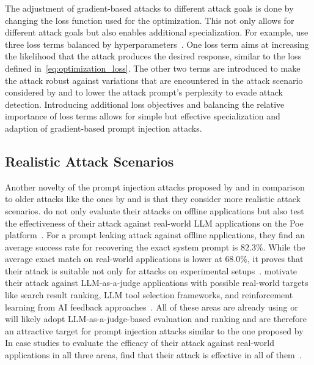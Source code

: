 The adjustment of gradient-based attacks to different attack goals is done by changing the loss function used for the optimization.
This not only allows for different attack goals but also enables additional specialization.
For example, \shi use three loss terms balanced by hyperparameters~\cite{shi_optimization-based_2024}.
One loss term aims at increasing the likelihood that the attack produces the desired response, similar to the loss defined in~\cref{eq:optimization_loss}.
The other two terms are introduced to make the attack robust against variations that are encountered in the attack scenario considered by \shi and to lower the attack prompt's perplexity to evade attack detection.
Introducing additional loss objectives and balancing the relative importance of loss terms allows for simple but effective specialization and adaption of gradient-based prompt injection attacks.

\subsection{Realistic Attack Scenarios} \label{sec:realistic_scenarios}
Another novelty of the prompt injection attacks proposed by \hui and \shi in comparison to older attacks like the ones by \perez and \deng is that they consider more realistic attack scenarios.
\hui do not only evaluate their attacks on offline applications but also test the effectiveness of their attack against real-world LLM applications on the Poe platform~\cite{hui_pleak_2024}.
For a prompt leaking attack against offline applications, they find an average success rate for recovering the exact system prompt is $82.3\%$.
While the average exact match on real-world applications is lower at $68.0\%$, it proves that their attack is suitable not only for attacks on experimental setups~\cite{hui_pleak_2024}.
\shi motivate their attack against LLM-as-a-judge applications with possible real-world targets like search result ranking, LLM tool selection frameworks, and reinforcement learning from AI feedback approaches~\cite{shi_optimization-based_2024}.
All of these areas are already using or will likely adopt LLM-as-a-judge-based evaluation and ranking and are therefore an attractive target for prompt injection attacks similar to the one proposed by \shi
In case studies to evaluate the efficacy of their attack against real-world applications in all three areas, \shi find that their attack is effective in all of them~\cite{shi_optimization-based_2024}.\\


